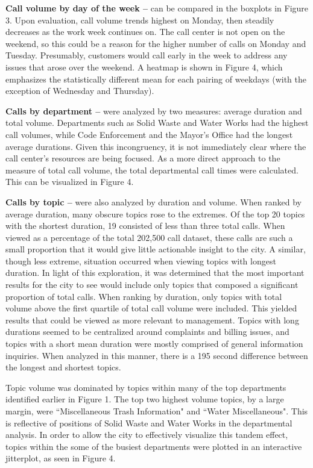 \documentclass{article}
\begin{document}
\textbf{Call volume by day of the week --} can be compared in the boxplots in Figure 3.  Upon evaluation, call volume trends highest on Monday, then steadily decreases as the work week continues on.  The call center is not open on the weekend, so this could be a reason for the higher number of calls on Monday and Tuesday. Presumably, customers would call early in the week to address any issues that arose over the weekend.  A heatmap is shown in Figure 4, which emphasizes the statistically different mean for each pairing of weekdays (with the exception of Wednesday and Thursday).
\par

\textbf{Calls by department --} were analyzed by two measures:  average duration and total volume.  Departments such as Solid Waste and Water Works had the highest call volumes, while Code Enforcement and the Mayor's Office had the longest average durations.  Given this incongruency, it is not immediately clear where the call center's resources are being focused.  As a more direct approach to the measure of total call volume, the total departmental call times were calculated.  This can be visualized in Figure 4.
\par

\textbf{Calls by topic --} were also analyzed by duration and volume.  When ranked by average duration, many obscure topics rose to the extremes.  Of the top 20 topics with the shortest duration, 19 consisted of less than three total calls.  When viewed as a percentage of the total 202,500 call dataset, these calls are such a small proportion that it would give little actionable insight to the city.  A similar, though less extreme, situation occurred when viewing topics with longest duration.  In light of this exploration, it was determined that the most important results for the city to see would include only topics that composed a significant proportion of total calls.  When ranking by duration, only topics with total volume above the first quartile of total call volume were included.  This yielded results that could be viewed as more relevant to management.  Topics with long durations seemed to be centralized around complaints and billing issues, and topics with a short mean duration were mostly comprised of general information inquiries.  When analyzed in this manner, there is a 195 second difference between the longest and shortest topics.
\par
Topic volume was dominated by topics within many of the top departments identified earlier in Figure 1.  The top two highest volume topics, by a large margin, were ``Miscellaneous Trash Information" and ``Water Miscellaneous".  This is reflective of positions of Solid Waste and Water Works in the departmental analysis.  In order to allow the city to effectively visualize this tandem effect, topics within the some of the busiest departments were plotted in an interactive jitterplot, as seen in Figure 4.
\end{document}

